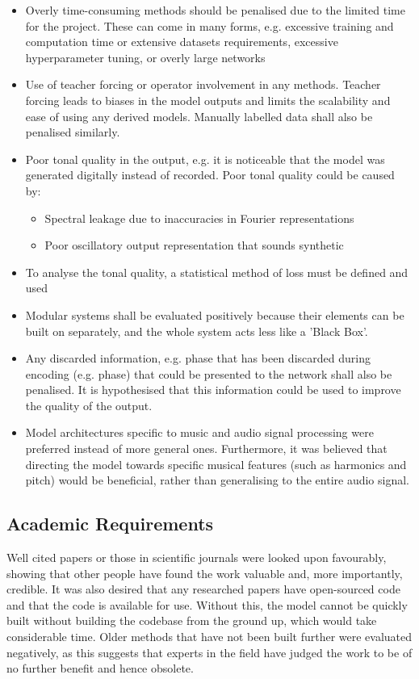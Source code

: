 \begin{itemize}
    \item Overly time-consuming methods should be penalised due to the limited time for the project. These can come in many forms, e.g. excessive training and computation time or extensive datasets requirements, excessive hyperparameter tuning, or overly large networks
    \item Use of teacher forcing or operator involvement in any methods. Teacher forcing leads to biases in the model outputs and limits the scalability and ease of using any derived models. Manually labelled data shall also be penalised similarly.
    \item Poor tonal quality in the output, e.g. it is noticeable that the model was generated digitally instead of recorded. Poor tonal quality could be caused by:
          \begin{itemize}
              \item Spectral leakage due to inaccuracies in Fourier representations
              \item Poor oscillatory output representation that sounds synthetic
          \end{itemize}
    \item To analyse the tonal quality, a statistical method of loss must be defined and used
    \item Modular systems shall be evaluated positively because their elements can be built on separately, and the whole system acts less like a 'Black Box'.
    \item Any discarded information, e.g. phase that has been discarded during encoding (e.g. phase) that could be presented to the network shall also be penalised. It is hypothesised that this information could be used to improve the quality of the output.
    \item Model architectures specific to music and audio signal processing were preferred instead of more general ones. Furthermore, it was believed that directing the model towards specific musical features (such as harmonics and pitch) would be beneficial, rather than generalising to the entire audio signal.
\end{itemize}

\subsection{Academic Requirements}

Well cited papers or those in scientific journals were looked upon favourably, showing that other people have found the work valuable and, more importantly, credible. It was also desired that any researched papers have open-sourced code and that the code is available for use. Without this, the model cannot be quickly built without building the codebase from the ground up, which would take considerable time. Older methods that have not been built further were evaluated negatively, as this suggests that experts in the field have judged the work to be of no further benefit and hence obsolete.

